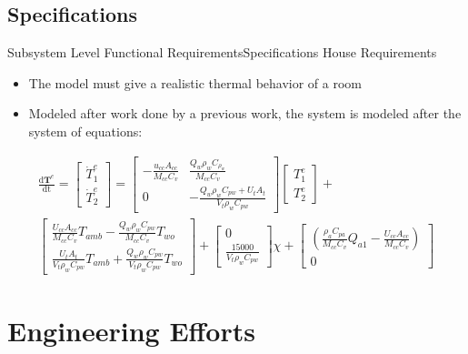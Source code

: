 \documentclass{beamer}
\begin{document}
\subsection{Specifications}
\begin{frame}{Subsystem Level Functional Requirements}{Specifications}
House Requirements
\begin{itemize}
    \item The model must give a realistic thermal behavior of a room
    \item Modeled after work done by a previous work, the system is modeled after the system of equations:
\end{itemize}
\begin{multline*}
    \label{eq:HVAC-Modeling}
    \frac{\mathrm{d}\mathbf{T}^e}{\mathrm{dt}} = 
    \begin{bmatrix}
    \dot{T}_1^e\\
    \dot{T}_2^e    
    \end{bmatrix}
    = 
    \begin{bmatrix}
    -\frac{u_{cc}A_{cc}}{M_{cc}C_v} & \frac{Q_w\rho_w C_{\rho_w}}{M_{cc}C_v}\\
    0 &  -\frac{Q_w\rho_wC_{pw}+U_tA_t}{V_t\rho_wC_{pw}}
    \end{bmatrix}
    \begin{bmatrix}
    T_1^e\\
    T_2^e
    \end{bmatrix}
    +\\
    \begin{bmatrix}
    \frac{U_{cc}A_{cc}}{M_{cc}C_v}T_{amb} - \frac{Q_w\rho_wC_{pw}}{M_{cc}C_v}T_{wo} \\
    \frac{U_tA_t}{V_t\rho_wC_{pw}}T_{amb} + \frac{Q_w\rho_wC_{pw}}{V_t\rho_wC_{pw}}T_{wo}
    \end{bmatrix}
    +
    \begin{bmatrix}
    0 \\
    \frac{15000}{V_t\rho_wC_{pw}}
    \end{bmatrix}
    \chi
    +
    \begin{bmatrix}
    (\frac{\rho_aC_{pa}}{M_{cc}C_v}Q_{a1}-\frac{U_{cc}A_{cc}}{M_{cc}C_v})\\
    0
    \end{bmatrix}    
\end{multline*}
\end{frame}
\section{Engineering Efforts}
\end{document}
